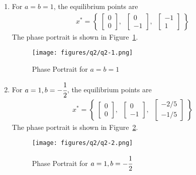 \begin{enumerate}[label= (\roman*)]
    \item For \( a = b = 1 \), the equilibrium points are
          \begin{align*}
              x^* =
              \left \{ \;
              \begin{bmatrix}
                  0 \\
                  0
              \end{bmatrix}, \; \;
              \begin{bmatrix}
                  0 \\
                  -1
              \end{bmatrix}, \; \;
              \begin{bmatrix}
                  -1 \\
                  1
              \end{bmatrix} \;
              \right \}
          \end{align*}
          The phase portrait is shown in Figure~\ref{fig:q2-1}.
          \begin{figure}[!ht]
              \centering
              \texttt{[image: figures/q2/q2-1.png]}
              \vspace*{-2.5em}
              \caption{
                  Phase Portrait for \( a = b = 1 \)
              }\label{fig:q2-1}
          \end{figure}

    \item For \( a = 1, b = -\cfrac{1}{2} \), the equilibrium points are
          \begin{align*}
              x^* =
              \left \{ \;
              \begin{bmatrix}
                  0 \\
                  0
              \end{bmatrix}, \; \;
              \begin{bmatrix}
                  0 \\
                  -1
              \end{bmatrix}, \; \;
              \begin{bmatrix}
                  -2/5 \\
                  -1/5
              \end{bmatrix} \;
              \right \}
          \end{align*}
          The phase portrait is shown in Figure~\ref{fig:q2-2}.
          \begin{figure}[!ht]
              \centering
              \texttt{[image: figures/q2/q2-2.png]}
              \vspace*{-2.5em}
              \caption{
                  Phase Portrait for \( a = 1, b = -\cfrac{1}{2} \)
              }\label{fig:q2-2}
          \end{figure}
\end{enumerate}
